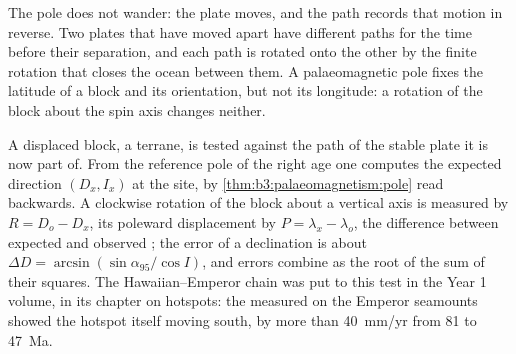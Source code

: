 The pole does not wander: the plate moves, and the path records that motion in
reverse. Two plates that have moved apart have different paths for the time
before their separation, and each path is rotated onto the other by the finite
rotation that closes the ocean between them. A palaeomagnetic pole fixes the
latitude of a block and its orientation, but not its longitude: a rotation of
the block about the spin axis changes neither.

A displaced block, a terrane, is tested against the path of the stable plate it
is now part of. From the reference pole of the right age one computes the
expected direction $(D_x, I_x)$ at the site, by \cref{thm:b3:palaeomagnetism:pole}
read backwards. A clockwise rotation of the block about a vertical axis is
measured by $R = D_o - D_x$, its poleward displacement by $P = \lambda_x -
\lambda_o$, the difference between expected and observed ; the
error of a declination is about $\Delta D = \arcsin(\sin\alpha_{95}/\cos I)$,
and errors combine as the root of the sum of their squares. The Hawaiian--Emperor
chain was put to this test in the Year 1 volume, in its chapter on hotspots:
the  measured on the Emperor seamounts showed the hotspot itself
moving south, by more than \qty{40}{mm/yr} from 81 to \qty{47}{Ma}.

